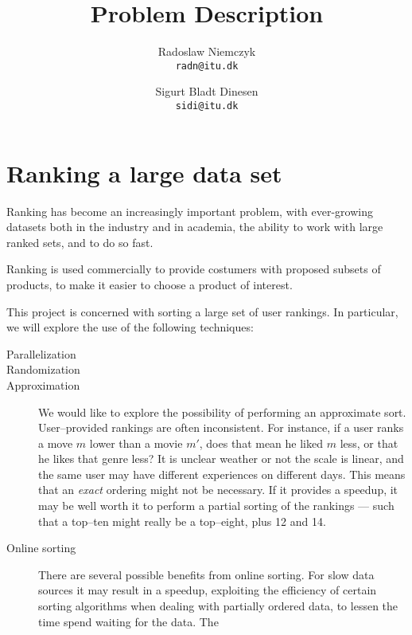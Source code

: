\documentclass[a4paper, titlepage]{report}
\renewcommand{\%}{\scalebox{.9}{\oldpct}}
\begin{document}
\title{Problem Description}
\author{
	Radoslaw Niemczyk
	\\\texttt{radn@itu.dk}
	\and
	Sigurt Bladt Dinesen
	\\\texttt{sidi@itu.dk}
}

\maketitle


\section*{Ranking a large data set}
Ranking has become an increasingly important problem, with ever-growing datasets
both in the industry and in academia, the ability to work with large ranked
sets, and to do so fast.

Ranking is used commercially to provide costumers with proposed subsets of
products, to make it easier to choose a product of interest.

This project is concerned with sorting a large set of user rankings.
In particular, we will explore the use of the following techniques:

\begin{description}
	\item[Parallelization] 

	\item[Randomization] 

	\item[Approximation] We would like to explore the possibility of
		performing an approximate sort. User--provided rankings are
		often inconsistent. For instance, if a user ranks a move $m$
		lower than a movie $m'$, does that mean he liked $m$ less, or
		that he likes that genre less? It is unclear weather or not the
		scale is linear, and the same user may have different
		experiences on different days. This means that an \textit{exact}
		ordering might not be necessary. If it provides a speedup, it
		may be well worth it to perform a partial sorting of the
		rankings --- such that a top--ten might really be a top--eight,
		plus 12 and 14.

	\item[Online sorting] There are several possible benefits from online
		sorting. For slow data sources it may result in a speedup,
		exploiting the efficiency of certain sorting algorithms when
		dealing with partially ordered data, to lessen the time spend
		waiting for the data. The 

\end{description}
\end{document}
